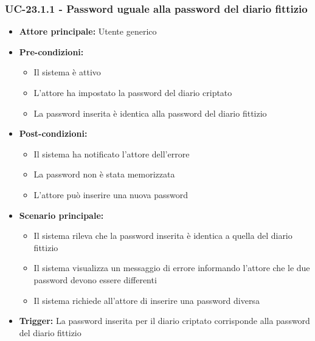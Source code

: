 \documentclass[a4paper,12pt]{article}
\begin{document}
\subsubsection{UC-23.1.1 - Password uguale alla password del diario fittizio} \label{subsec:UC-23.1.1}
\begin{itemize}
    \item \textbf{Attore principale:} Utente generico
    \item \textbf{Pre-condizioni:}
    \begin{itemize}
        \item Il sistema è attivo
        \item L'attore ha impostato la password del diario criptato
        \item La password inserita è identica alla password del diario fittizio
    \end{itemize}
    \item \textbf{Post-condizioni:} 
    \begin{itemize}
        \item Il sistema ha notificato l'attore dell'errore
        \item La password non è stata memorizzata
        \item L'attore può inserire una nuova password
    \end{itemize}
    \item \textbf{Scenario principale:} 
    \begin{itemize}
        \item Il sistema rileva che la password inserita è identica a quella del diario fittizio
        \item Il sistema visualizza un messaggio di errore informando l'attore che le due password devono essere differenti
        \item Il sistema richiede all'attore di inserire una password diversa
    \end{itemize}
    \item \textbf{Trigger:} La password inserita per il diario criptato corrisponde alla password del diario fittizio
\end{itemize}
\end{document}
